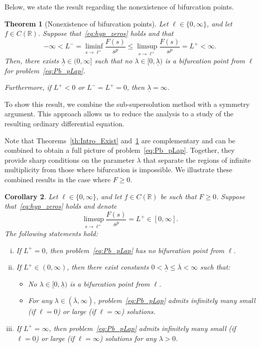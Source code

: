 \documentclass[10pt,twoside,english,reqno,a4paper]{amsart}
\theoremstyle{plain}
\theoremstyle{plain}
\newtheorem{theorem}{Theorem}[section]
\newtheorem{corollary}[theorem]{Corollary}
\theoremstyle{definition}
\theoremstyle{remark}
\numberwithin{equation}{section}
\newcommand{\R}{\mathbb{R}}
\newcommand{\oL}{L^+}
\newcommand{\uL}{L^-}
\begin{document}
Below, we state the result regarding the nonexistence of bifurcation points.

\begin{theorem}[Nonexistence of bifurcation points]
\label{th:Intro_NonExist}
Let $\ell\in \{0,\infty\}$, and let $f\in C(\R)$. Suppose that~\eqref{eq:hyp_zeros} holds and that
\begin{equation}
\label{eq:hyp_infsup2}
    -\infty <\uL = \liminf_{s\to \ell^+} \frac{F(s)}{s^p} \leq \limsup_{s\to \ell^+} \frac{F(s)}{s^p} = \oL < \infty.
\end{equation}
Then, there exists $\underline{\lambda}\in (0,\infty]$ such that no $\lambda\in [0, \underline{\lambda})$ is a bifurcation point from $\ell$ for problem~\eqref{eq:Pb_pLap}.

Furthermore, if $\oL<0$ or $\uL=\oL= 0$, then $\underline{\lambda}=\infty$.
\end{theorem}

To show this result, we combine the sub-supersolution method with a symmetry argument. This approach allows us to reduce the analysis to a study of the resulting ordinary differential equation.

Note that Theorems~\ref{th:Intro_Exist} and~\ref{th:Intro_NonExist} are complementary and can be combined to obtain a full picture of problem~\eqref{eq:Pb_pLap}. Together, they provide sharp conditions on the parameter $\lambda$ that separate the regions of infinite multiplicity from those where bifurcation is impossible. We illustrate these combined results in the case where $F\geq 0$.

\begin{corollary}
\label{cor:F_nonnegative}
Let $\ell\in \{0,\infty\}$, and let $f\in C(\R)$ be such that $F\geq 0$. Suppose that~\eqref{eq:hyp_zeros} holds and denote
\begin{equation*}
    \limsup_{s\to \ell^+} \frac{F(s)}{s^p} = \oL \in [0,\infty].
\end{equation*}
The following statements hold:
\begin{enumerate}[i)]
    \item If $\oL=0$, then problem~\eqref{eq:Pb_pLap} has no bifurcation point from $\ell$.
    \item If $\oL\in (0,\infty)$, then there exist constants $0 < \underline{\lambda} \leq \overline{\lambda} < \infty$ such that:
    \begin{itemize}
        \item No $\lambda\in [0,\underline{\lambda})$ is a bifurcation point from $\ell$.
        \item For any $\lambda\in (\overline{\lambda},\infty)$, problem~\eqref{eq:Pb_pLap} admits infinitely many small (if $\ell=0$) or large (if $\ell=\infty$) solutions.
    \end{itemize}
    \item If $\oL=\infty$, then problem~\eqref{eq:Pb_pLap} admits infinitely many small (if $\ell=0$) or large (if $\ell=\infty$) solutions for any $\lambda>0$.
\end{enumerate}

\end{corollary}
\end{document}
